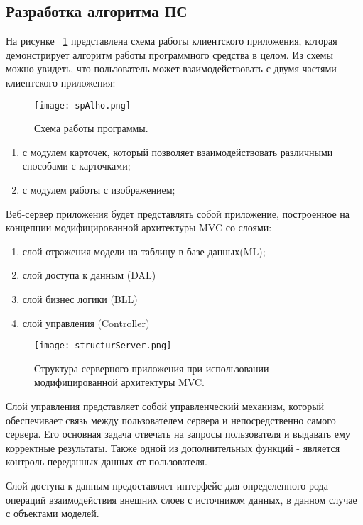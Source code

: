 \subsection{Разработка алгоритма ПС }
\label{sub:arch_and_mod:alholib}
На рисунке ~\ref{fig:domain:manual_structure:alho_sp} представлена схема работы клиентского приложения, которая демонстрирует алгоритм работы программного средства в целом. Из схемы можно увидеть, что пользователь может взаимодействовать с двумя частями клиентского приложения:

\begin{figure}[ht]
\centering
  \texttt{[image: spAlho.png]}  
  \caption{ Схема работы программы. }
  \label{fig:domain:manual_structure:alho_sp}
\end{figure}

\begin{enumerate}
  \item с модулем карточек, который позволяет взаимодействовать различными способами с карточками;
  \item с модулем работы с изображением;
\end{enumerate}
Веб-сервер приложения будет представлять собой приложение, построенное на концепции модифицированной архитектуры MVC со слоями:
\begin{enumerate}
  \item слой отражения модели на таблицу в базе данных(ML);
  \item слой доступа к данным (DAL)
  \item слой бизнес логики (BLL)
  \item слой управления (Controller)
\end{enumerate}
\begin{figure}[ht]
\centering
  \texttt{[image: structurServer.png]}  
  \caption{ Структура серверного-приложения при использовании модифицированной архитектуры MVC. }
  \label{fig:domain:manual_structure:structural_server}
\end{figure}

Слой управления представляет собой управленческий механизм, который обеспечивает связь между пользователем сервера и непосредственно самого сервера. Его основная задача отвечать на запросы пользователя и выдавать ему корректные результаты. Также одной из дополнительных функций - является контроль переданных данных от пользователя.

Слой доступа к данным предоставляет интерфейс для определенного рода операций взаимодействия внешних слоев с источником данных, в данном случае с объектами моделей.

